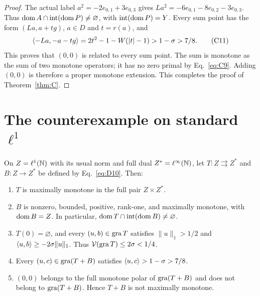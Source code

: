 \begin{proof}
The actual label $a^2=-2e_{0,1}+3e_{0,3}$ gives
$La^2=-6e_{0,1}-8e_{0,2}-3e_{0,3}$. Thus
$\operatorname{dom} A\cap\operatorname{int}(\operatorname{dom} P)\ne\varnothing$, with
$\operatorname{int}(\operatorname{dom} P)=Y$. Every sum point has the form
$(La,a+tg)$, $a\in D$ and $t=r(a)$, and
\begin{equation}
\langle -La,-a-tg\rangle=2t^2-1-W(|t|-1)>1-\sigma>7/8.
\tag{C11}\label{eq:C11}
\end{equation}
This proves that $(0,0)$ is related to every sum point. The sum is
monotone as the sum of two monotone operators; it has no zero primal by
Eq.~\eqref{eq:C9}. Adding $(0,0)$ is therefore a proper monotone extension.
This completes the proof of Theorem~\ref{thm:C}.
\end{proof}


\section{The counterexample on standard $\ell^1$}
\label{sec:l1}
\renewcommand{\thetheorem}{L}
\begin{theorem}\label{thm:L}
On $Z=\ell^1(\mathbb N)$ with its usual norm and full dual $Z^*=\ell^\infty(\mathbb N)$,
let $T:Z\rightrightarrows Z^*$ and $B:Z\to Z^*$ be defined by Eq.~\eqref{eq:D10}.
Then:
\begin{enumerate}
\item $T$ is maximally monotone in the full pair $Z\times Z^*$.
\item $B$ is nonzero, bounded, positive, rank-one, and maximally monotone,
with $\operatorname{dom} B=Z$. In particular,
$\operatorname{dom} T\cap\operatorname{int}(\operatorname{dom} B)\ne\varnothing$.
\item $T(0)=\varnothing$, and every $(u,b)\in\operatorname{gra} T$ satisfies
$\|u\|_1>1/2$ and $\langle u,b\rangle\ge-2\sigma\|u\|_1$.
Thus $\mathcal V(\operatorname{gra} T)\le2\sigma<1/4$.
\item Every $(u,c)\in\operatorname{gra}(T+B)$ satisfies
$\langle u,c\rangle>1-\sigma>7/8$.
\item $(0,0)$ belongs to the full monotone polar of $\operatorname{gra}(T+B)$ and does
not belong to $\operatorname{gra}(T+B)$. Hence $T+B$ is not maximally monotone.
\end{enumerate}
\end{theorem}
